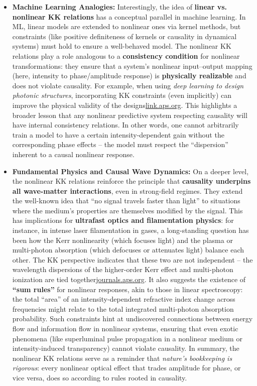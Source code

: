 \documentclass[11pt,a4paper]{article}
\begin{document}
\begin{itemize}
  \item \textbf{Machine Learning Analogies:} Interestingly, the idea of \textbf{linear vs. nonlinear KK relations} has a conceptual parallel in machine learning. In ML, linear models are extended to nonlinear ones via kernel methods, but constraints (like positive definiteness of kernels or causality in dynamical systems) must hold to ensure a well-behaved model. The nonlinear KK relations play a role analogous to a \textbf{consistency condition} for nonlinear transformations: they ensure that a system’s nonlinear input–output mapping (here, intensity to phase/amplitude response) is \textbf{physically realizable} and does not violate causality. For example, when using \emph{deep learning to design photonic structures}, incorporating KK constraints (even implicitly) can improve the physical validity of the designs\href{https://link.aps.org/doi/10.1103/PhysRevApplied.22.L041002#:~:text=Driving deep,learning to dramatically improve}{link.aps.org}. This highlights a broader lesson that any nonlinear predictive system respecting causality will have internal consistency relations. In other words, one cannot arbitrarily train a model to have a certain intensity-dependent gain without the corresponding phase effects – the model must respect the “dispersion” inherent to a causal nonlinear response.
  \item \textbf{Fundamental Physics and Causal Wave Dynamics:} On a deeper level, the nonlinear KK relations reinforce the principle that \textbf{causality underpins all wave-matter interactions}, even in strong-field regimes. They extend the well-known idea that “no signal travels faster than light” to situations where the medium’s properties are themselves modified by the signal. This has implications for \textbf{ultrafast optics and filamentation physics}: for instance, in intense laser filamentation in gases, a long-standing question has been how the Kerr nonlinearity (which focuses light) and the plasma or multi-photon absorption (which defocuses or attenuates light) balance each other. The KK perspective indicates that these two are not independent – the wavelength dispersions of the higher-order Kerr effect and multi-photon ionization are tied together\href{https://journals.aps.org/pra/abstract/10.1103/PhysRevA.85.033806#:~:text=As previous theoretical results recently,While shorter laser}{journals.aps.org}. It also suggests the existence of \textbf{“sum rules”} for nonlinear responses, akin to those in linear spectroscopy: the total “area” of an intensity-dependent refractive index change across frequencies might relate to the total integrated multi-photon absorption probability. Such constraints hint at undiscovered connections between energy flow and information flow in nonlinear systems, ensuring that even exotic phenomena (like superluminal pulse propagation in a nonlinear medium or intensity-induced transparency) cannot violate causality. In summary, the nonlinear KK relations serve as a reminder that \emph{nature’s bookkeeping is rigorous}: every nonlinear optical effect that trades amplitude for phase, or vice versa, does so according to rules rooted in causality.
\end{itemize}
\end{document}
